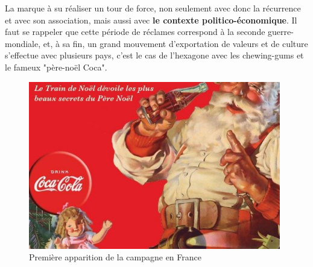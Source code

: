 La marque à su réaliser un tour de force, non seulement avec donc la récurrence et avec son association, mais aussi avec \textbf{le contexte politico-économique}. Il faut se rappeler que cette période de réclames correspond à la seconde guerre-mondiale, et, à sa fin, un grand mouvement d'exportation de valeurs et de culture s'effectue avec plusieurs pays, c'est le cas de l'hexagone avec les chewing-gums et le fameux "père-noël Coca".\parencite{Ref4}

\begin{figure}[th]
\centering
\includegraphics[width=110mm]{medias/france_coca}
\decoRule
\caption{Première apparition de la campagne en France}
\end{figure}
